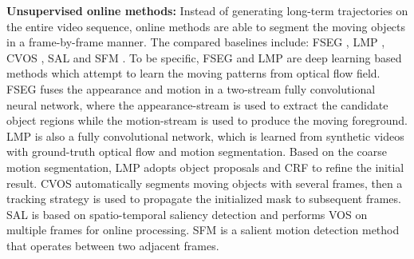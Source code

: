 \documentclass[journal]{IEEEtran}
\begin{document}
{\bf Unsupervised online methods:} 
Instead of generating long-term trajectories on the entire video sequence, online methods are able to segment the moving objects in a frame-by-frame manner. 
The compared baselines include: FSEG \cite{CVPR2017_Jain}, LMP \cite{CVPR2017_Tokmakov}, CVOS \cite{CVPR2015_Taylor}, SAL \cite{CVPR2015_Wang} and SFM \cite{CVPR2012_Perazzi}.
To be specific, 
FSEG \cite{CVPR2017_Jain} and LMP \cite{CVPR2017_Tokmakov} are deep learning based methods which attempt to learn the moving patterns from optical flow field.
FSEG \cite{CVPR2017_Jain} fuses the appearance and motion in a two-stream fully convolutional neural network,
where the appearance-stream is used to extract the candidate object regions while the motion-stream is used to produce the moving foreground.
LMP \cite{CVPR2017_Tokmakov} is also a fully convolutional network, which is learned from synthetic videos with ground-truth optical flow and motion segmentation. Based on the coarse motion segmentation, LMP adopts object proposals and CRF to refine the initial result.
CVOS \cite{CVPR2015_Taylor} automatically segments moving objects with several frames, then a tracking strategy is used to propagate the initialized mask to subsequent frames.
SAL \cite{CVPR2015_Wang} is based on spatio-temporal saliency detection and performs VOS on multiple frames for online processing.
SFM \cite{CVPR2012_Perazzi} is a salient motion detection method that operates between two adjacent frames.
\end{document}

